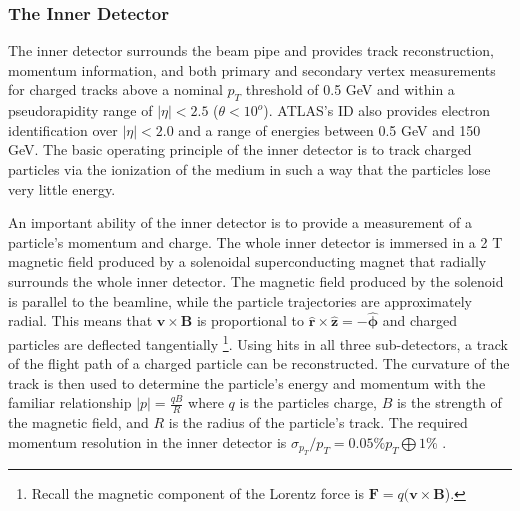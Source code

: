 \subsubsection{The Inner Detector}
\label{subsubsec:id}
The inner detector surrounds the beam pipe and provides track reconstruction,
momentum information, and both primary and secondary vertex measurements for
charged tracks above a nominal $p_{T}$ threshold of 0.5 GeV and within
a pseudorapidity range of $|\eta| < 2.5$ ($\theta < 10^o$). ATLAS's ID also provides electron
identification over $|\eta| < 2.0$ and 
a range of energies between 0.5 GeV and 150 GeV. The basic
operating principle of the inner detector is to track charged particles
via the ionization of the medium in such a way that the particles lose very
little energy. 

An important ability of the inner detector is to provide a measurement of
a particle's momentum and charge. The whole inner detector is immersed in a 2 T
magnetic field produced by a solenoidal superconducting magnet that radially
surrounds the whole inner detector. The magnetic field produced by the
solenoid is parallel to the beamline, while the particle trajectories are
approximately radial. This means that $\mathbf{v} \times \mathbf{B}$ is proportional
to $\mathbf{\hat r} \times \mathbf{\hat z} = -\mathbf{\hat \phi}$ and
charged particles are deflected tangentially
\footnote{Recall the magnetic
component of the Lorentz force is $\mathbf{F} = q(\mathbf{v} \times \mathbf{B}$).}.
Using hits in all three sub-detectors, a
track of the flight path of a charged particle can be reconstructed. The
curvature of the track is then used to determine the particle's energy and
momentum with the familiar relationship $|p| = \frac{q B}{R}$
where $q$ is the particles charge, $B$ is the strength of the magnetic field, and 
$R$ is the radius of the particle's track. The required momentum resolution
in the inner detector is $\sigma_{p_T}/p_T = 0.05\% p_T \bigoplus 1\%$
\cite{Innerdesign}.

